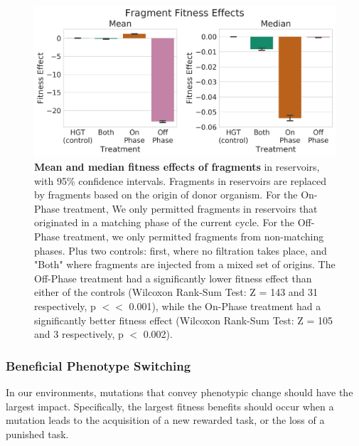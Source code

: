 \documentclass[letterpaper]{article}
\begin{document}
	\begin{figure}[h!]
	\begin{center}
	\includegraphics[width=0.95\columnwidth]{figures/fitness_effect_by_cycle_phase_source.png}
	\caption{\textbf{Mean and median fitness effects of fragments} in reservoirs, with 95\% confidence intervals. Fragments in reservoirs are replaced by fragments based on the origin of donor organism. For the On-Phase treatment, We only permitted fragments in reservoirs that originated in a matching phase of the current cycle. For the Off-Phase treatment, we only permitted fragments from non-matching phases. Plus two controls: first, where no filtration takes place, and "Both" where fragments are injected from a mixed set of origins. The Off-Phase treatment had a significantly lower fitness effect than either of the controls (Wilcoxon Rank-Sum Test: Z = 143 and 31 respectively, p $<<$ 0.001), while the On-Phase treatment had a significantly better fitness effect (Wilcoxon Rank-Sum Test: Z = 105 and 3 respectively, p $<$ 0.002). 
	}\label{fig:fitness_effect_by_cycle_phase_source}
	\end{center}
	\end{figure}

\subsubsection{Beneficial Phenotype Switching}
In our environments, mutations that convey phenotypic change should have the largest impact. Specifically, the largest fitness benefits should occur when a mutation leads to the acquisition of a new rewarded task, or the loss of a punished task.  
\end{document}
